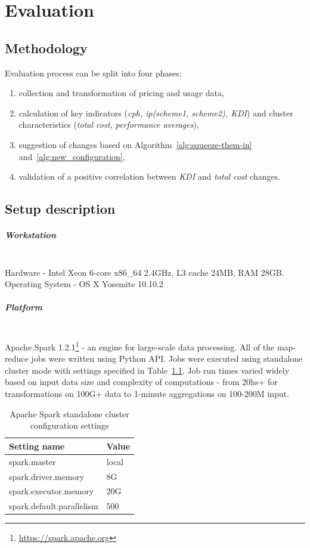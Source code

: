 \documentclass[]{final_report}
\newcommand{\myparagraph}[1]{\paragraph{#1}\mbox{}\\}
\begin{document}

\chapter{Evaluation}

\section{Methodology}

Evaluation process can be split into four phases:
\begin{enumerate}
\item collection and transformation of pricing and usage data,
\item calculation of key indicators (\textit{cph, ip(scheme1, scheme2), KDI}) and cluster characteristics (\textit{total cost, performance averages}), 
\item suggestion of changes based on Algorithm~\ref{alg:squeeze-them-in} and~\ref{alg:new_configuration},
\item validation of a positive correlation between \textit{KDI} and \textit{total cost} changes.
\end{enumerate}

\section{Setup description}

\myparagraph{Workstation}
Hardware - Intel Xeon 6-core x86\_64 2.4GHz, L3 cache 24MB, RAM 28GB. \\
Operating System - OS X Yosemite 10.10.2

\myparagraph{Platform}
Apache Spark 1.2.1\footnote{\url{https://spark.apache.org}} - an engine for large-scale data processing. All of the map-reduce jobs were written using Python API. Jobs were executed using standalone cluster mode with settings specified in Table~\ref{tab:spark_conf}. Job run times varied widely based on input data size and complexity of computations - from 20hs+ for transformations on 100G+ data to 1-minute aggregations on 100-200M input.

\begin{table}[h]
\begin{center}
    \begin{tabular}{| l | l |}
    \hline
    \textbf{Setting name} & \textbf{Value} \\
    \hline
    spark.master & local \\
    \hline
    spark.driver.memory & 8G \\
    \hline
    spark.executor.memory & 20G \\
    \hline
    spark.default.parallelism & 500 \\
    \hline
    \end{tabular}
\end{center}
\caption{Apache Spark standalone cluster configuration settings} 
\label{tab:spark_conf}
\end{table}
\end{document}
